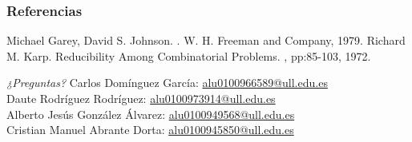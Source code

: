\documentclass{beamer}
\begin{document}
\begin{frame}[allowframebreaks]
    \frametitle<presentation>{Referencias}
    \begin{thebibliography}{10}    
        \beamertemplatebookbibitems
             Michael Garey, David S. Johnson.
            .
            \newblock W. H. Freeman and Company, 1979.
        \beamertemplatearticlebibitems
            Richard M. Karp.
            \newblock Reducibility Among Combinatorial Problems.
            , pp:85-103, 1972.
  \end{thebibliography}
\end{frame}

\begin{frame}{}
    \centering \Huge
    \emph{¿Preguntas?}
    \vfill
     Carlos Domínguez García: \url{alu0100966589@ull.edu.es}\\
     Daute Rodríguez Rodríguez: \url{alu0100973914@ull.edu.es}\\
     Alberto Jesús González Álvarez: \url{alu0100949568@ull.edu.es }\\
     Cristian Manuel Abrante Dorta: \url{alu0100945850@ull.edu.es}\\
\end{frame}
\end{document}

